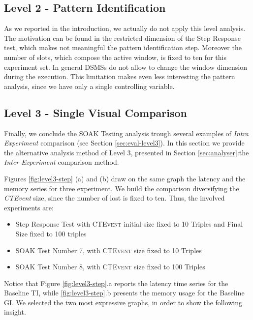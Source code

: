 


\subsection{Level 2 - Pattern Identification}\label{sec:level2-step-pattern}

As we reported in the introduction, we actually do not apply this level analysis. The motivation can be found in the restricted dimension of the Step Response test, which makes not meaningful the pattern identification step. Moreover the number of slots, which compose the active window, is fixed to ten for this experiment set. In general DSMSs do not allow to change the window dimension during the execution. This limitation makes even less interesting the pattern analysis, since we have only a single controlling variable.

\subsection{Level 3 - Single Visual Comparison}\label{sec:level3-step-inter}

Finally, we conclude the SOAK Testing analysis trough several examples of \textit{Intra Experiment} comparison (see Section \ref{sec:eval-level3}). In this section we provide the alternative analysis method of Level 3, presented in Section \ref{sec:analyser}:the  \textit{Inter Experiment} comparison method.

Figures \ref{fig:level3-step} (a) and (b) draw on the same graph the latency and the memory series for three experiment.  We build the comparison diversifying the \textit{CTEvent} size, since the number of lost is fixed to ten. Thus, the involved experiments are:
\begin{itemize}
\item Step Response Test with \textsc{CTEvent} initial size fixed to 10 Triples and Final Size fixed to 100 triples
\item SOAK Test Number 7, with \textsc{CTEvent} size fixed to 10 Triples
\item SOAK Test Number 8, with \textsc{CTEvent} size fixed to 100 Triples
\end{itemize}

Notice that Figure \ref{fig:level3-step}.a reports the latency time series for the Baseline TI, while \ref{fig:level3-step}.b presents the memory usage for the Baseline GI. We selected the two most expressive graphs, in order to show the following insight.

